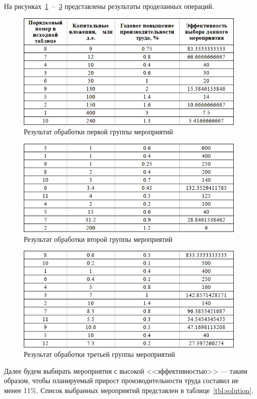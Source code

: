 На рисунках~\ref{fig:tabl12}~--~\ref{fig:tabl14} представлены результаты проделанных операций.

\begin{figure}[htbp]
  \centering
  \includegraphics[width=0.8\linewidth]{img/tabl12}
  \caption{Результат обработки первой группы мероприятий}\label{fig:tabl12}
\end{figure}

\begin{figure}[htbp]
  \centering
  \includegraphics[width=0.8\linewidth]{img/tabl13}
  \caption{Результат обработки второй группы мероприятий}\label{fig:tabl13}
\end{figure}

\begin{figure}[htbp]
  \centering
  \includegraphics[width=0.8\linewidth]{img/tabl14}
  \caption{Результат обработки третьей группы мероприятий}\label{fig:tabl14}
\end{figure}

\newpage

Далее будем выбирать мероприятия с высокой <<эффективностью>> --- таким образом,
чтобы планируемый прирост производительности труда составил не менее 11\%.
Список выбранных мероприятий представлен в таблице~\ref{tbl:solution}.

